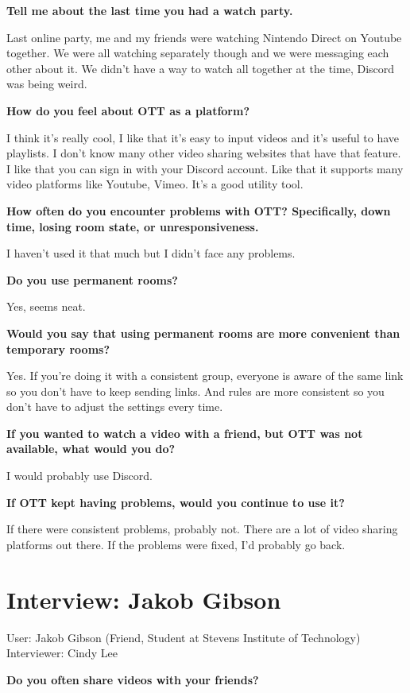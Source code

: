 \textbf{Tell me about the last time you had a watch party.}

Last online party, me and my friends were watching Nintendo Direct on Youtube together. We were all watching separately though and we were messaging each other about it. We didn't have a way to watch all together at the time, Discord was being weird.

\textbf{How do you feel about OTT as a platform?}

I think it's really cool, I like that it's easy to input videos and it's useful to have playlists. I don't know many other video sharing websites that have that feature. I like that you can sign in with your Discord account. Like that it supports many video platforms like Youtube, Vimeo. It's a good utility tool.

\textbf{How often do you encounter problems with OTT? Specifically, down time, losing room state, or unresponsiveness.}

I haven't used it that much but I didn't face any problems.

\textbf{Do you use permanent rooms?}

Yes, seems neat.

\textbf{Would you say that using permanent rooms are more convenient than temporary rooms?}

Yes. If you're doing it with a consistent group, everyone is aware of the same link so you don't have to keep sending links. And rules are more consistent so you don't have to adjust the settings every time.

\textbf{If you wanted to watch a video with a friend, but OTT was not available, what would you do?}

I would probably use Discord.

\textbf{If OTT kept having problems, would you continue to use it?}

If there were consistent problems, probably not. There are a lot of video sharing platforms out there. If the problems were fixed, I'd probably go back.


\section{Interview: Jakob Gibson}

User: Jakob Gibson (Friend, Student at Stevens Institute of Technology) \\
Interviewer: Cindy Lee

\textbf{Do you often share videos with your friends?}

